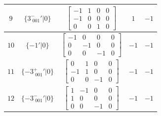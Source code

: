 \documentclass[fleqn,8pt]{jsarticle}
\begin{document}
\begin{longtable}{ccccc}
$ 9 $ & $ \{3^{-}_{\,\,001}{}'|0\} $ & $ \begin{bmatrix} -1 & 1 & 0 & 0 \\ -1 & 0 & 0 & 0 \\ 0 & 0 & 1 & 0 \end{bmatrix} $ & $ 1 $ & $ -1 $ \\ \hline
$ 10 $ & $ \{-1{}'|0\} $ & $ \begin{bmatrix} -1 & 0 & 0 & 0 \\ 0 & -1 & 0 & 0 \\ 0 & 0 & -1 & 0 \end{bmatrix} $ & $ -1 $ & $ -1 $ \\ \hline
$ 11 $ & $ \{-3^{+}_{\,\,001}{}'|0\} $ & $ \begin{bmatrix} 0 & 1 & 0 & 0 \\ -1 & 1 & 0 & 0 \\ 0 & 0 & -1 & 0 \end{bmatrix} $ & $ -1 $ & $ -1 $ \\ \hline
$ 12 $ & $ \{-3^{-}_{\,\,001}{}'|0\} $ & $ \begin{bmatrix} 1 & -1 & 0 & 0 \\ 1 & 0 & 0 & 0 \\ 0 & 0 & -1 & 0 \end{bmatrix} $ & $ -1 $ & $ -1 $ \\
\end{longtable}
\end{document}
